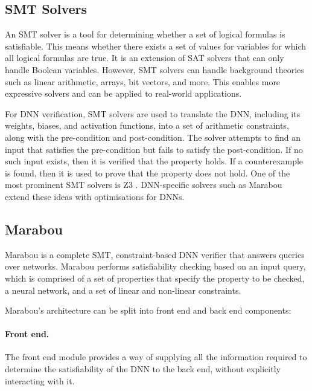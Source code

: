 \subsection{SMT Solvers}

An SMT solver is a tool for determining whether a set of logical formulas is satisfiable. This means whether there exists a set of values for variables for which all logical formulas are true. It is an extension of SAT solvers that can only handle Boolean variables. However, SMT solvers can handle background theories such as linear arithmetic, arrays, bit vectors, and more. This enables more expressive solvers and can be applied to real-world applications.

For DNN verification, SMT solvers are used to translate the DNN, including its weights, biases, and activation functions, into a set of arithmetic constraints, along with the pre-condition and post-condition. The solver attempts to find an input that satisfies the pre-condition but fails to satisfy the post-condition. If no such input exists, then it is verified that the property holds. If a counterexample is found, then it is used to prove that the property does not hold. One of the most prominent SMT solvers is Z3 \citet{z3} . DNN-specific solvers such as Marabou extend these ideas with optimisations for DNNs.

\subsection{Marabou}

Marabou is a complete SMT, constraint-based DNN verifier \cite{marabou} that answers queries over networks. Marabou performs satisfiability checking based on an input query, which is comprised of a set of properties that specify the property to be checked, a neural network, and a set of linear and non-linear constraints.
\vspace{0.5cm}

Marabou's architecture can be split into front end and back end components:
\paragraph*{Front end.} The front end module provides a way of supplying all the information required to determine the satisfiability of the DNN to the back end, without explicitly interacting with it.

